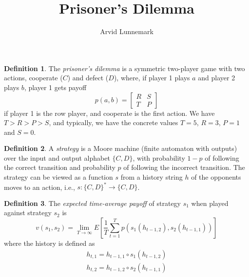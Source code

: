 \documentclass[11pt]{amsart}
\title{Prisoner's Dilemma}
\author{Arvid Lunnemark}
\theoremstyle{definition}
\newtheorem{definition}{Definition}
\theoremstyle{remark}
\begin{document}
\maketitle

\begin{definition}
  The \textit{prisoner's dilemma} is a symmetric two-player game with two actions, cooperate ($C$) and defect ($D$), where, if player 1 plays $a$ and player 2 plays $b$, player 1 gets payoff 
  \begin{equation*}
    p(a,b) = \begin{bmatrix}
      R & S \\
      T & P
    \end{bmatrix}
  \end{equation*}
  if player 1 is the row player, and cooperate is the first action. We have $T > R > P > S$, and typically, we have the concrete values $T = 5$, $R = 3$, $P = 1$ and $S = 0$.
\end{definition}

\begin{definition}
  A \textit{strategy} is a Moore machine (finite automaton with outputs) over the input and output alphabet $\{C, D\}$, with probability $1-p$ of following the correct transition and probability $p$ of following the incorrect transition. 
  The strategy can be viewed as a function $s$ from a history string $h$ of the opponents moves to an action, i.e., $s : \{C, D\}^* \to \{C,D\}$.
\end{definition}

\begin{definition}
  The \textit{expected time-average payoff} of strategy $s_1$ when played against strategy $s_2$ is \begin{equation*}
    v(s_1, s_2) = \lim_{T \to \infty} E \left[ \frac{1}{T} \sum_{t = 1}^T p(s_1(h_{t-1, 2}), s_2(h_{t-1, 1})) \right]
  \end{equation*}
  where the history is defined as \begin{equation*}
    \begin{split}
    h_{t, 1} = h_{t-1, 1} \circ s_1(h_{t-1, 2})  \\
    h_{t, 2} = h_{t-1, 2} \circ s_2(h_{t-1, 1}) 
    \end{split}
  \end{equation*}
\end{definition}
\end{document}

